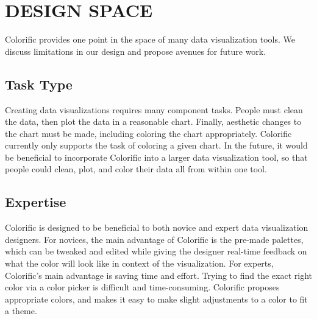 \documentclass{article}
\begin{document}

\section{DESIGN SPACE}
Colorific provides one point in the space of many data visualization tools. We discuss limitations in our design and propose avenues for future work. 

\subsection{Task Type}
Creating data visualizations requires many component tasks. People must clean the data, then plot the data in a reasonable chart. Finally, aesthetic changes to the chart must be made, including coloring the chart appropriately. Colorific currently only supports the task of coloring a given chart. In the future, it would be beneficial to incorporate Colorific into a larger data visualization tool, so that people could clean, plot, and color their data all from within one tool. 

\subsection{Expertise}
Colorific is designed to be beneficial to both novice and expert data visualization designers. For novices, the main advantage of Colorific is the pre-made palettes, which can be tweaked and edited while giving the designer real-time feedback on what the color will look like in context of the visualization. For experts, Colorific's main advantage is saving time and effort. Trying to find the exact right color via a color picker is difficult and time-consuming. Colorific proposes appropriate colors, and makes it easy to make slight adjustments to a color to fit a theme. 
\end{document}
